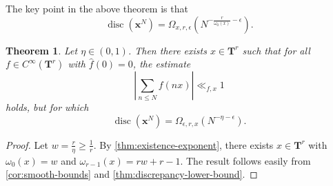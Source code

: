 \documentclass{article}
\DeclareMathOperator{\disc}{disc}
\newcommand{\bT}{\mathbf{T}}
\newcommand{\bx}{{\boldsymbol x}}
\newtheorem{theorem}[subsection]{Theorem}
\theoremstyle{definition}
\begin{document}
The key point in the above theorem is that 
\[
	\disc(\bx^N) = \Omega_{x,r,\epsilon}\left(N^{-\frac{r}{\omega_0(x)}-\epsilon}\right) .
\]

\begin{theorem}
Let $\eta\in (0,1)$. Then there exists $x\in \bT^r$ such that for all 
$f\in C^\infty(\bT^r)$ with $\widehat f(0)=0$, the estimate 
\[
	\left| \sum_{n\leqslant N} f(n x)\right|\ll_{f,x} 1
\]
holds, but for which 
\[
	\disc(\bx^N) = \Omega_{\epsilon,r,x}\left(N^{-\eta - \epsilon}\right) .
\]
\end{theorem}
\begin{proof}
Let $w=\frac{r}{\eta} \geqslant \frac 1 r$. By 
\autoref{thm:existence-exponent}, there exists $x\in \bT^r$ with 
$\omega_0(x)=w$ and $\omega_{r-1}(x)=r w+r-1$. The result follows easily 
from \autoref{cor:smooth-bounds} and \autoref{thm:discrepancy-lower-bound}. 
\end{proof}





\printbibliography
\end{document}
